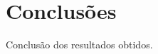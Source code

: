 \documentclass[12pt]{article}
\begin{document}
\hypertarget{conclusuxf5es}{%
\section{Conclusões}\label{conclusuxf5es}}

Conclusão dos resultados obtidos.



\end{document}

